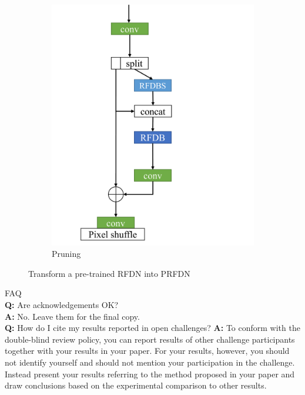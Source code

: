 \documentclass[10pt,twocolumn,letterpaper]{article}
\begin{document}
\begin{figure}
\begin{subfigure}[b]{0.49\linewidth}
        \includegraphics[width=\textwidth]{../Pruning.pdf}
        \caption{Pruning}
        \label{fig:Pruning}
    \end{subfigure}
    \caption{Transform a pre-trained RFDN into PRFDN}
    \label{fig:PRFDN}
\end{figure}

\noindent
FAQ\medskip\\
{\bf Q:} Are acknowledgements OK?\\
{\bf A:} No.  Leave them for the final copy.\medskip\\
{\bf Q:} How do I cite my results reported in open challenges?
{\bf A:} To conform with the double-blind review policy, you can report results of other challenge participants together with your results in your paper.
For your results, however, you should not identify yourself and should not mention your participation in the challenge.
Instead present your results referring to the method proposed in your paper and draw conclusions based on the experimental comparison to other results.\medskip\\

\end{document}
